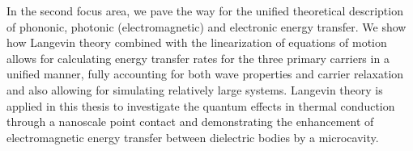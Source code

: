 
In the second focus area, we pave the way for the unified theoretical description of phononic, photonic (electromagnetic) and electronic energy transfer. We show how Langevin theory \cite{langevin08,zwanzig} combined with the linearization of equations of motion allows for calculating energy transfer rates for the three primary carriers in a unified manner, fully accounting for both wave properties and carrier relaxation and also allowing for simulating relatively large systems.  Langevin theory is applied in this thesis to investigate the quantum effects in thermal conduction through a nanoscale point contact and demonstrating the enhancement of electromagnetic energy transfer between dielectric bodies by a microcavity.



